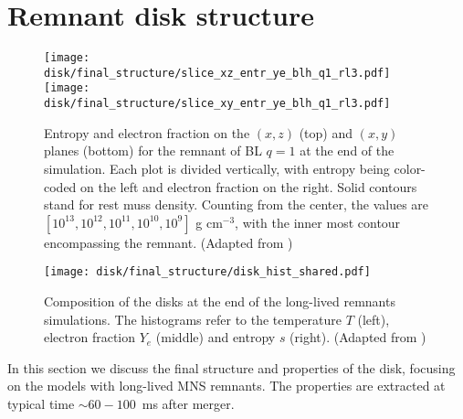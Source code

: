 

\section{Remnant disk structure}

\begin{figure}[t]
    \centering
    \texttt{[image: disk/final\_structure/slice\_xz\_entr\_ye\_blh\_q1\_rl3.pdf]}
    \texttt{[image: disk/final\_structure/slice\_xy\_entr\_ye\_blh\_q1\_rl3.pdf]}
    \caption{Entropy and electron fraction on the $(x,z)$ (top) and
        $(x,y)$ planes (bottom) for the remnant of BL $q=1$ at the end
        of the simulation. Each plot is divided vertically, with entropy
        being color-coded on the left and electron fraction on the
        right. Solid contours stand for rest muss density. Counting from
        the center, the values are $[10^{13}, 10^{12}, 10^{11}, 10^{10},
        10^{9}]$ g cm$^{-3}$, with the inner most contour encompassing
        the remnant.
        (Adapted from \citet{Nedora:2020pak})
    }  
    \label{fig:snapshots_xy_ye_entr}
\end{figure}

\begin{figure*}[t]
    \centering 
    \texttt{[image: disk/final\_structure/disk\_hist\_shared.pdf]}
    \caption{Composition of the disks at the end of the long-lived
        remnants simulations. The histograms refer to the temperature $T$
        (left),
        electron fraction $Y_e$
        (middle) and entropy $s$ (right).
        (Adapted from \citet{Nedora:2020pak})
    }
    \label{fig:final_disk_struct_hist_long}
\end{figure*}

In this section we discuss the final structure and properties of the disk, 
focusing on the models with long-lived \ac{MNS} remnants.
The properties are extracted at typical time $\sim60{-}100$~ms after merger.

